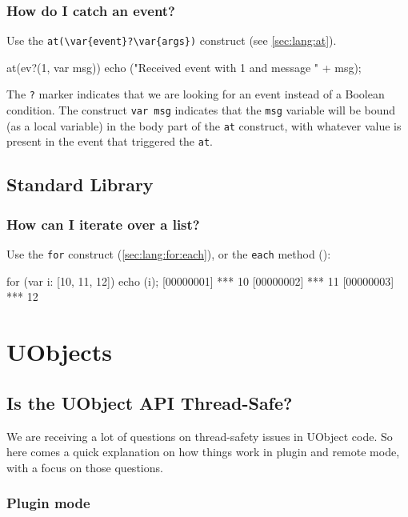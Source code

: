 \subsubsection{How do I catch an event?}
Use the \lstinline|at(\var{event}?\var{args})| construct (see
\autoref{sec:lang:at}).

\begin{urbiunchecked}
at(ev?(1, var msg))
  echo ("Received event with 1 and message " + msg);
\end{urbiunchecked}

The \lstinline{?} marker indicates that we are looking for an event
instead of a Boolean condition. The construct \lstinline{var msg}
indicates that the \lstinline{msg} variable will be bound (as a local
variable) in the body part of the \lstinline{at} construct, with
whatever value is present in the event that triggered the
\lstinline{at}.

\subsection{Standard Library}

\subsubsection{How can I iterate over a list?}
Use the \lstinline{for} construct (\autoref{sec:lang:for:each}), or
the \lstinline|each| method ():

\begin{urbiscript}
for (var i: [10, 11, 12]) echo (i);
[00000001] *** 10
[00000002] *** 11
[00000003] *** 12
\end{urbiscript}

\section{UObjects}
\subsection{Is the UObject API Thread-Safe?}
We are receiving a lot of questions on thread-safety issues in UObject
code. So here comes a quick explanation on how things work in plugin
and remote mode, with a focus on those questions.

\subsubsection{Plugin mode}

